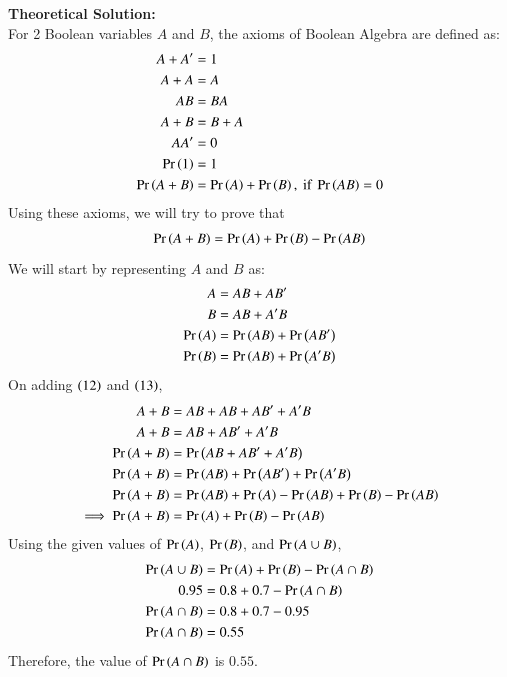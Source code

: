 \documentclass[journal]{IEEEtran}
\begin{document}
\textbf{Theoretical Solution:\\}
For 2 Boolean variables \(A\) and \(B\), the axioms of Boolean Algebra are defined as:
\begin{align}
	A + A^\prime &= 1\\
	A + A &= A\\
	AB &= BA\\
	A + B &= B + A\\
	AA^\prime &= 0\\
	\Pr\left(1\right) &= 1\\
	\Pr\left(A + B\right) &= \Pr\left(A\right) + \Pr\left(B\right), \text{ if } \Pr\left(AB\right) = 0
\end{align}
Using these axioms, we will try to prove that
\begin{align}
	\Pr\left(A + B\right) = \Pr\left(A\right) + \Pr\left(B\right) - \Pr\left(AB\right)
\end{align}
We will start by representing \(A\) and \(B\) as:
\begin{align}
	A &= AB + AB^\prime\\
	B &= AB + A^\prime B\\
	\Pr\left(A\right) &= \Pr\left(AB\right) + \Pr\left(AB^\prime\right)\\
	\Pr\left(B\right) &= \Pr\left(AB\right) + \Pr\left(A^\prime B\right)
\end{align}
On adding \(\left(12\right)\) and \(\left(13\right)\),
\begin{align}
	A + B &= AB + AB + AB^\prime + A^\prime B\\
	A + B &= AB + AB^\prime + A^\prime B\\
	\Pr\left(A + B\right) &= \Pr\left(AB + AB^\prime + A^\prime B\right)\\
	\Pr\left(A + B\right) &= \Pr\left(AB\right) + \Pr\left(AB^\prime\right) + \Pr\left(A^\prime B\right)\\
	\Pr\left(A + B\right) &= \Pr\left(AB\right) + \Pr\left(A\right) - \Pr\left(AB\right) + \Pr\left(B\right) - \Pr\left(AB\right)\\
	\implies \Pr\left(A + B\right) &= \Pr\left(A\right) + \Pr\left(B\right) - \Pr\left(AB\right)
\end{align}
Using the given values of \(\Pr\left(A\right)\), \(\Pr\left(B\right)\), and \(\Pr\left(A \cup B\right)\),
\begin{align}
	\Pr\left(A \cup B\right) &= \Pr\left(A\right) + \Pr\left(B\right) - \Pr\left(A \cap B\right)\\
	0.95 &= 0.8 + 0.7 - \Pr\left(A \cap B\right)\\
	\Pr\left(A \cap B\right) &= 0.8 + 0.7 - 0.95\\
	\Pr\left(A \cap B\right) &= 0.55
\end{align}
Therefore, the value of \(\Pr\left(A \cap B\right)\) is \(0.55\).\\\\
\end{document}
